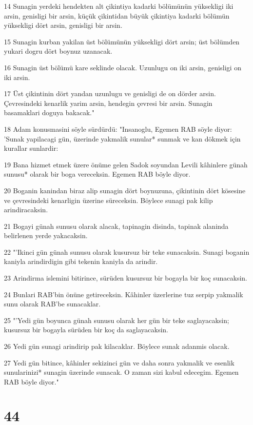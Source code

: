 \par 14 Sunagin yerdeki hendekten alt çikintiya kadarki bölümünün yüksekligi iki arsin, genisligi bir arsin, küçük çikintidan büyük çikintiya kadarki bölümün yüksekligi dört arsin, genisligi bir arsin.
\par 15 Sunagin kurban yakilan üst bölümünün yüksekligi dört arsin; üst bölümden yukari dogru dört boynuz uzanacak.
\par 16 Sunagin üst bölümü kare seklinde olacak. Uzunlugu on iki arsin, genisligi on iki arsin.
\par 17 Üst çikintinin dört yandan uzunlugu ve genisligi de on dörder arsin. Çevresindeki kenarlik yarim arsin, hendegin çevresi bir arsin. Sunagin basamaklari doguya bakacak."
\par 18 Adam konusmasini söyle sürdürdü: "Insanoglu, Egemen RAB söyle diyor: 'Sunak yapilacagi gün, üzerinde yakmalik sunular* sunmak ve kan dökmek için kurallar sunlardir:
\par 19 Bana hizmet etmek üzere önüme gelen Sadok soyundan Levili kâhinlere günah sunusu* olarak bir boga vereceksin. Egemen RAB böyle diyor.
\par 20 Boganin kanindan biraz alip sunagin dört boynuzuna, çikintinin dört kösesine ve çevresindeki kenarligin üzerine süreceksin. Böylece sunagi pak kilip arindiracaksin.
\par 21 Bogayi günah sunusu olarak alacak, tapinagin disinda, tapinak alaninda belirlenen yerde yakacaksin.
\par 22 "'Ikinci gün günah sunusu olarak kusursuz bir teke sunacaksin. Sunagi boganin kaniyla arindirdigin gibi tekenin kaniyla da arindir.
\par 23 Arindirma islemini bitirince, sürüden kusursuz bir bogayla bir koç sunacaksin.
\par 24 Bunlari RAB'bin önüne getireceksin. Kâhinler üzerlerine tuz serpip yakmalik sunu olarak RAB'be sunacaklar.
\par 25 "'Yedi gün boyunca günah sunusu olarak her gün bir teke saglayacaksin; kusursuz bir bogayla sürüden bir koç da saglayacaksin.
\par 26 Yedi gün sunagi arindirip pak kilacaklar. Böylece sunak adanmis olacak.
\par 27 Yedi gün bitince, kâhinler sekizinci gün ve daha sonra yakmalik ve esenlik sunularinizi* sunagin üzerinde sunacak. O zaman sizi kabul edecegim. Egemen RAB böyle diyor."

\chapter{44}

